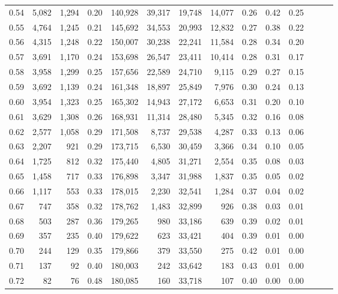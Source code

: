 \begin{tabular}{rrrrrrrrrrrrrr}
0.54 &  5,082 &  1,294 &  0.20 &  140,928 &   39,317 &  19,748 &  14,077 &  0.26 &  0.42 &      0.25 \\
0.55 &  4,764 &  1,245 &  0.21 &  145,692 &   34,553 &  20,993 &  12,832 &  0.27 &  0.38 &      0.22 \\
0.56 &  4,315 &  1,248 &  0.22 &  150,007 &   30,238 &  22,241 &  11,584 &  0.28 &  0.34 &      0.20 \\
0.57 &  3,691 &  1,170 &  0.24 &  153,698 &   26,547 &  23,411 &  10,414 &  0.28 &  0.31 &      0.17 \\
0.58 &  3,958 &  1,299 &  0.25 &  157,656 &   22,589 &  24,710 &   9,115 &  0.29 &  0.27 &      0.15 \\
0.59 &  3,692 &  1,139 &  0.24 &  161,348 &   18,897 &  25,849 &   7,976 &  0.30 &  0.24 &      0.13 \\
0.60 &  3,954 &  1,323 &  0.25 &  165,302 &   14,943 &  27,172 &   6,653 &  0.31 &  0.20 &      0.10 \\
0.61 &  3,629 &  1,308 &  0.26 &  168,931 &   11,314 &  28,480 &   5,345 &  0.32 &  0.16 &      0.08 \\
0.62 &  2,577 &  1,058 &  0.29 &  171,508 &    8,737 &  29,538 &   4,287 &  0.33 &  0.13 &      0.06 \\
0.63 &  2,207 &    921 &  0.29 &  173,715 &    6,530 &  30,459 &   3,366 &  0.34 &  0.10 &      0.05 \\
0.64 &  1,725 &    812 &  0.32 &  175,440 &    4,805 &  31,271 &   2,554 &  0.35 &  0.08 &      0.03 \\
0.65 &  1,458 &    717 &  0.33 &  176,898 &    3,347 &  31,988 &   1,837 &  0.35 &  0.05 &      0.02 \\
0.66 &  1,117 &    553 &  0.33 &  178,015 &    2,230 &  32,541 &   1,284 &  0.37 &  0.04 &      0.02 \\
0.67 &    747 &    358 &  0.32 &  178,762 &    1,483 &  32,899 &     926 &  0.38 &  0.03 &      0.01 \\
0.68 &    503 &    287 &  0.36 &  179,265 &      980 &  33,186 &     639 &  0.39 &  0.02 &      0.01 \\
0.69 &    357 &    235 &  0.40 &  179,622 &      623 &  33,421 &     404 &  0.39 &  0.01 &      0.00 \\
0.70 &    244 &    129 &  0.35 &  179,866 &      379 &  33,550 &     275 &  0.42 &  0.01 &      0.00 \\
0.71 &    137 &     92 &  0.40 &  180,003 &      242 &  33,642 &     183 &  0.43 &  0.01 &      0.00 \\
0.72 &     82 &     76 &  0.48 &  180,085 &      160 &  33,718 &     107 &  0.40 &  0.00 &      0.00 \\

\end{tabular}
